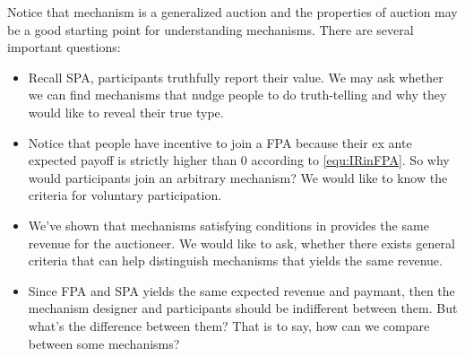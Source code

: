 Notice that mechanism is a generalized auction and the properties of auction may be a good starting point for understanding mechanisms. There are several important questions: 
\begin{itemize}
    \item Recall SPA, participants truthfully report their value. We may ask whether we can find mechanisms that nudge people to do truth-telling and why they would like to reveal their true type.
    \item Notice that people have incentive to join a FPA because their ex ante expected payoff is strictly higher than 0 according to \eqref{equ:IRinFPA}. So why would participants join an arbitrary mechanism? We would like to know the criteria for voluntary participation.
    \item We've shown that mechanisms satisfying conditions in  provides the same revenue for the auctioneer. We would like to ask, whether there exists general criteria that can help distinguish mechanisms that yields the same revenue.
    \item Since FPA and SPA yields the same expected revenue and paymant, then the mechanism designer and participants should be indifferent between them. But what's the difference between them? That is to say, how can we compare between some mechanisms?
\end{itemize}

